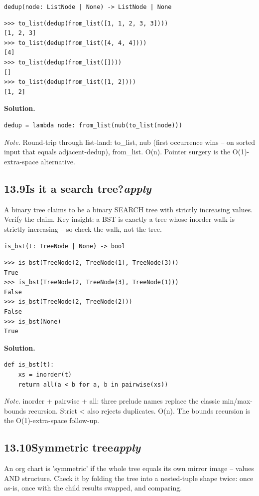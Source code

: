 \documentclass[10pt,letterpaper]{book}
\begin{document}
\noindent\texttt{dedup(node: ListNode | None) -> ListNode | None}
\begin{lstlisting}[style=ex]
>>> to_list(dedup(from_list([1, 1, 2, 3, 3])))
[1, 2, 3]
>>> to_list(dedup(from_list([4, 4, 4])))
[4]
>>> to_list(dedup(from_list([])))
[]
>>> to_list(dedup(from_list([1, 2])))
[1, 2]
\end{lstlisting}
\noindent\textbf{Solution.}
\begin{lstlisting}[style=code]
dedup = lambda node: from_list(nub(to_list(node)))
\end{lstlisting}
\noindent\textit{Note.} Round-trip through list-land: to\_list, nub (first occurrence wins -- on sorted input that equals adjacent-dedup), from\_list. O(n). Pointer surgery is the O(1)-extra-space alternative.

\subsection*{13.9\quad Is it a search tree?\hfill\textnormal{\textit{apply}}}
A binary tree claims to be a binary SEARCH tree with strictly increasing values. Verify the claim. Key insight: a BST is exactly a tree whose inorder walk is strictly increasing -- so check the walk, not the tree.

\noindent\texttt{is\_bst(t: TreeNode | None) -> bool}
\begin{lstlisting}[style=ex]
>>> is_bst(TreeNode(2, TreeNode(1), TreeNode(3)))
True
>>> is_bst(TreeNode(2, TreeNode(3), TreeNode(1)))
False
>>> is_bst(TreeNode(2, TreeNode(2)))
False
>>> is_bst(None)
True
\end{lstlisting}
\noindent\textbf{Solution.}
\begin{lstlisting}[style=code]
def is_bst(t):
    xs = inorder(t)
    return all(a < b for a, b in pairwise(xs))
\end{lstlisting}
\noindent\textit{Note.} inorder + pairwise + all: three prelude names replace the classic min/max-bounds recursion. Strict < also rejects duplicates. O(n). The bounds recursion is the O(1)-extra-space follow-up.

\subsection*{13.10\quad Symmetric tree\hfill\textnormal{\textit{apply}}}
An org chart is 'symmetric' if the whole tree equals its own mirror image -- values AND structure. Check it by folding the tree into a nested-tuple shape twice: once as-is, once with the child results swapped, and comparing.
\end{document}
